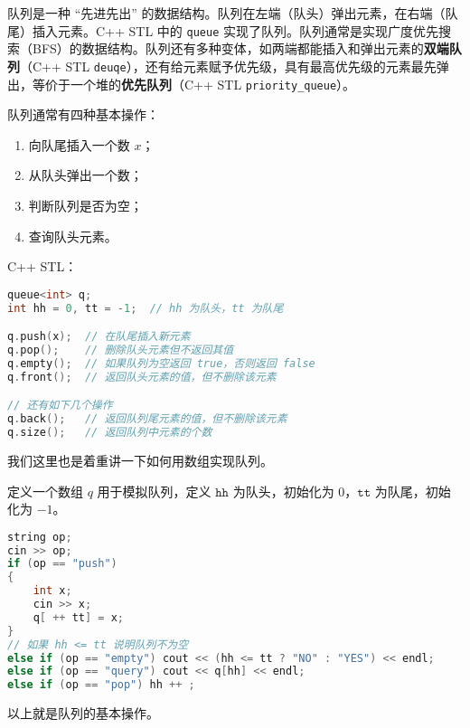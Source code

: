
队列是一种 “先进先出” 的数据结构。队列在左端（队头）弹出元素，在右端（队尾）插入元素。C++ STL 中的 \verb|queue| 实现了队列。队列通常是实现广度优先搜索（BFS）的数据结构。队列还有多种变体，如两端都能插入和弹出元素的\textbf{双端队列}（C++ STL \verb|deuqe|），还有给元素赋予优先级，具有最高优先级的元素最先弹出，等价于一个堆的\textbf{优先队列}（C++ STL \verb|priority_queue|）。

队列通常有四种基本操作：

\begin{enumerate}
\item 向队尾插入一个数 $x$；
\item 从队头弹出一个数；
\item 判断队列是否为空；
\item 查询队头元素。
\end{enumerate}

C++ STL：

\begin{lstlisting}[language=cpp]
queue<int> q;
int hh = 0, tt = -1;  // hh 为队头，tt 为队尾

q.push(x);  // 在队尾插入新元素
q.pop();    // 删除队头元素但不返回其值
q.empty();  // 如果队列为空返回 true，否则返回 false
q.front();  // 返回队头元素的值，但不删除该元素

// 还有如下几个操作
q.back();   // 返回队列尾元素的值，但不删除该元素
q.size();   // 返回队列中元素的个数

\end{lstlisting}

我们这里也是着重讲一下如何用数组实现队列。

定义一个数组 $q$ 用于模拟队列，定义 $\mathtt{hh}$ 为队头，初始化为 $0$，$\mathtt{tt}$ 为队尾，初始化为 $-1$。

\begin{lstlisting}[language=cpp]
string op;
cin >> op;
if (op == "push") 
{
    int x;
    cin >> x;
    q[ ++ tt] = x;
} 
// 如果 hh <= tt 说明队列不为空
else if (op == "empty") cout << (hh <= tt ? "NO" : "YES") << endl;
else if (op == "query") cout << q[hh] << endl;
else if (op == "pop") hh ++ ;
\end{lstlisting}

以上就是队列的基本操作。